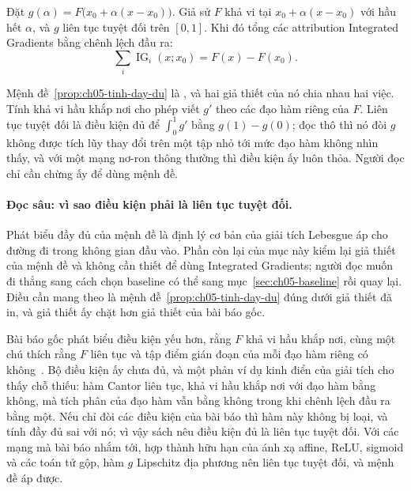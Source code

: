%
\begin{proposition}
\label{prop:ch05-tinh-day-du}
Đặt $g(\alpha)=F\bigl(x_0+\alpha(x-x_0)\bigr)$. Giả sử $F$ khả vi tại
$x_0+\alpha(x-x_0)$ với hầu hết $\alpha$, và $g$ liên tục tuyệt đối trên
$[0,1]$. Khi đó tổng các attribution Integrated Gradients bằng chênh lệch
đầu ra:
\begin{equation}
\sum_i \operatorname{IG}_i(x;x_0)=F(x)-F(x_0).
\end{equation}
\end{proposition}

Mệnh đề~\ref{prop:ch05-tinh-day-du} là , và hai
giả thiết của nó chia nhau hai việc. Tính khả vi hầu khắp nơi cho phép viết $g'$
theo các đạo hàm riêng của $F$. Liên tục tuyệt đối là điều kiện đủ để
$\int_0^1 g'$ bằng $g(1)-g(0)$; đọc thô thì nó đòi $g$ không được tích lũy thay
đổi trên một tập nhỏ tới mức đạo hàm không nhìn thấy, và với một mạng nơ-ron
thông thường thì điều kiện ấy luôn thỏa. Người đọc chỉ cần chừng ấy để dùng
mệnh đề.

\paragraph{Đọc sâu: vì sao điều kiện phải là liên tục tuyệt đối.}
Phát biểu đầy đủ của mệnh đề là định lý cơ bản của giải tích Lebesgue áp cho
đường đi trong không gian đầu vào.
Phần còn lại của mục này kiểm lại giả thiết của mệnh đề và không cần thiết để
dùng Integrated Gradients; người đọc muốn đi thẳng sang cách chọn baseline có
thể sang mục~\ref{sec:ch05-baseline} rồi quay lại. Điều cần mang theo là
mệnh đề~\ref{prop:ch05-tinh-day-du} đúng dưới giả thiết đã in, và giả thiết ấy
chặt hơn giả thiết của bài báo gốc.

Bài báo gốc phát biểu điều kiện yếu hơn, rằng $F$ khả vi hầu khắp nơi, cùng
một chú thích rằng $F$ liên tục và tập điểm gián đoạn của mỗi đạo hàm riêng
có  không~\autocite{p11ig}. Bộ điều kiện ấy chưa đủ, và một phản ví dụ
kinh điển của giải tích cho thấy chỗ thiếu: hàm Cantor liên tục, khả vi hầu
khắp nơi với đạo hàm bằng không, mà tích phân của đạo hàm vẫn bằng không trong
khi chênh lệch đầu ra bằng một. Nếu chỉ đòi các điều kiện của bài báo thì hàm
này không bị loại, và tính đầy đủ sai với nó; vì vậy sách nêu điều kiện đủ là
liên tục tuyệt đối. Với các mạng mà bài báo nhắm
tới, hợp thành hữu hạn của ánh xạ affine, ReLU, sigmoid và các toán tử gộp,
hàm $g$ Lipschitz địa phương nên liên tục tuyệt đối, và mệnh đề áp được.

